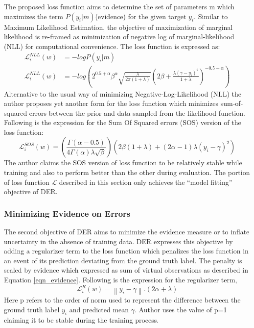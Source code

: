 	The proposed loss function aims to determine the set of parameters m which maximizes the term $P(y_i|m)$(evidence) for the given target $y_i$. Similar to Maximum Likelihood Estimation, the objective of maximization of marginal likelihood is re-framed as minimization of negative log of marginal-likelihood (NLL) for computational convenience.
	The loss function is expressed as:
	\begin{align}
		\mathcal{L}_i^{NLL}(w)&=-logP(y_i|m)\\
		\mathcal{L}_i^{NLL}(w)&= -log(2^{0.5+\alpha}\beta^\alpha\sqrt{\frac{\lambda}{2\pi(1+\lambda)}}(2\beta+\frac{\lambda(\gamma-y_i)^2}{1+\lambda})^{-0.5-\alpha})
	\end{align}
	Alternative to the usual way of minimizing Negative-Log-Likelihood (NLL) the author proposes yet another form for the loss function which minimizes sum-of-squared errors between the prior and data sampled from the likelihood function. Following is the expression for the Sum Of Squared errors (SOS) version of the loss function:
	\begin{equation}
		\mathcal{L}_i^{SOS}(w)=(\frac{\Gamma(\alpha-0.5)}{4\Gamma(\alpha)\lambda\sqrt{\beta}})(2\beta(1+\lambda)+(2\alpha-1)\lambda(y_i-\gamma)^2)
	\end{equation}
	The author claims the SOS version of loss function to be relatively stable while training and also to perform better than the other during evaluation. The portion of loss function $\mathcal{L}$ described in this section only achieves the \enquote{model fitting} objective of DER. 
	
	\subsubsection{Minimizing Evidence on Errors}
	The second objective of DER aims to minimize the evidence measure or to inflate uncertainty in the absence of training data. DER expresses this objective by adding a regularizer term to the loss function which penalizes the loss function in an event of its prediction deviating from the ground truth label. The penalty is scaled by evidence which expressed as sum of virtual observations as described in Equation \ref{eqn_evidence}. Following is the expression for the regularizer term,
	\begin{equation}
		\mathcal{L}_{i}^R(w) = \left\| {y_i - \gamma}\right\|.(2\alpha+\lambda)
	\end{equation}
	Here p refers to the order of norm used to represent the difference between the ground truth label $y_i$ and predicted mean $\gamma$. Author uses the value of p=1 claiming it to be stable during the training process.
	
